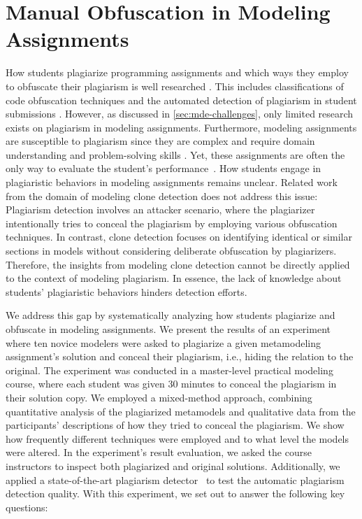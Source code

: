 
\section{Manual Obfuscation in Modeling Assignments}\label{sec:human-plagiarism}
How students plagiarize programming assignments and which ways they employ to obfuscate their plagiarism is well researched \cite{Novak2019}.
This includes classifications of code obfuscation techniques \cite{Faidhi1987, Karnalim2016} and the automated detection of plagiarism in student submissions \cite{prechelt2002}.
However, as discussed in \autoref{sec:mde-challenges}, only limited research exists on plagiarism in modeling assignments. Furthermore, modeling assignments are susceptible to plagiarism since they are complex and require domain understanding and problem-solving skills \cite{Martinez2020}.
Yet, these assignments are often the only way to evaluate the student's performance~\cite{Ciccozzi2018}.
How students engage in plagiaristic behaviors in modeling assignments remains unclear.
Related work from the domain of modeling clone detection \cite{Babur2019} does not address this issue: Plagiarism detection involves an attacker scenario, where the plagiarizer intentionally tries to conceal the plagiarism by employing various obfuscation techniques. In contrast, clone detection focuses on identifying identical or similar sections in models without considering deliberate obfuscation by plagiarizers.
Therefore, the insights from modeling clone detection cannot be directly applied to the context of modeling plagiarism.
In essence, the lack of knowledge about students' plagiaristic behaviors hinders detection efforts.

We address this gap by systematically analyzing how students plagiarize and obfuscate in modeling assignments.
We present the results of an experiment where ten novice modelers were asked to plagiarize a given metamodeling assignment's solution and conceal their plagiarism, i.e., hiding the relation to the original.
The experiment was conducted in a master-level practical modeling course, where each student was given 30 minutes to conceal the plagiarism in their solution copy.
We employed a mixed-method approach, combining quantitative analysis of the plagiarized metamodels and qualitative data from the participants' descriptions of how they tried to conceal the plagiarism.
We show how frequently different techniques were employed and to what level the models were altered.
In the experiment's result evaluation, we asked the course instructors to inspect both plagiarized and original solutions.
Additionally, we applied a state-of-the-art plagiarism detector~\cite{Saglam2022} to test the automatic plagiarism detection quality.
With this experiment, we set out to answer the following key questions:

